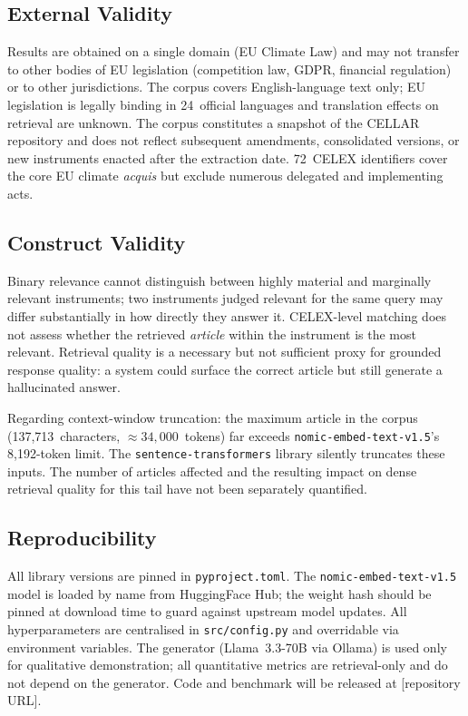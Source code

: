 \documentclass[sigconf,screen]{acmart}
\newcommand{\nomic}{\texttt{nomic-embed-text-v1.5}\xspace}
\begin{document}
\subsection{External Validity}
\label{sec:validity-external}

Results are obtained on a single domain (EU Climate Law) and may not
transfer to other bodies of EU legislation (competition law, GDPR,
financial regulation) or to other jurisdictions.  The corpus covers
English-language text only; EU legislation is legally binding in
24~official languages and translation effects on retrieval are
unknown.  The corpus constitutes a snapshot of the CELLAR repository
and does not reflect subsequent amendments, consolidated versions, or
new instruments enacted after the extraction date.  72~CELEX
identifiers cover the core EU climate \textit{acquis} but exclude
numerous delegated and implementing acts.

\subsection{Construct Validity}
\label{sec:validity-construct}

Binary relevance cannot distinguish between highly material and
marginally relevant instruments; two instruments judged relevant for
the same query may differ substantially in how directly they answer
it.  CELEX-level matching does not assess whether the retrieved
\emph{article} within the instrument is the most relevant.  Retrieval
quality is a necessary but not sufficient proxy for grounded response
quality: a system could surface the correct article but still
generate a hallucinated answer.

Regarding context-window truncation: the maximum article in the
corpus (137{,}713~characters, ${\approx}34{,}000$~tokens) far exceeds
\nomic's 8{,}192-token limit.  The \texttt{sentence-transformers}
library silently truncates these inputs.  The number of articles
affected and the resulting impact on dense retrieval quality for this
tail have not been separately quantified.

\subsection{Reproducibility}
\label{sec:validity-reproducibility}

All library versions are pinned in \texttt{pyproject.toml}.  The
\nomic model is loaded by name from HuggingFace Hub; the weight hash
should be pinned at download time to guard against upstream model
updates.  All hyperparameters are centralised in \texttt{src/config.py}
and overridable via environment variables.  The generator
(Llama~3.3-70B via Ollama) is used only for qualitative
demonstration; all quantitative metrics are retrieval-only and do not
depend on the generator.  Code and benchmark will be released at
[repository URL].
\end{document}
